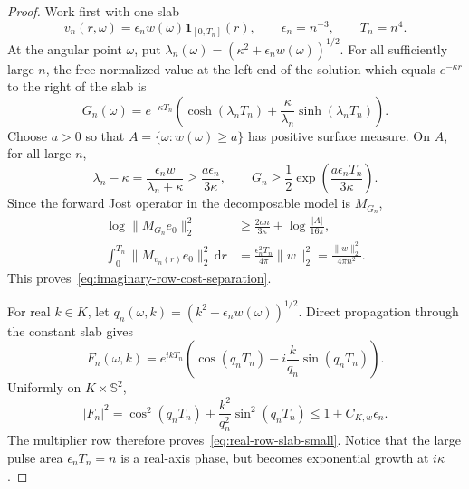 \documentclass[11pt]{article}
\newcommand{\dd}{\,\mathrm d}
\theoremstyle{definition}
\theoremstyle{remark}
\begin{document}
\begin{proof}
Work first with one slab
\begin{equation}
 v_n(r,\omega)=\epsilon_n w(\omega)\mathbf1_{[0,T_n]}(r),
 \qquad \epsilon_n=n^{-3},\qquad T_n=n^4.
 \label{eq:single-long-weak-slab}
\end{equation}
At the angular point $\omega$, put
$\lambda_n(\omega)=(\kappa^2+\epsilon_nw(\omega))^{1/2}$.
For all sufficiently large $n$, the free-normalized value at the left end of
the solution which equals $e^{-\kappa r}$ to the right of the slab is
\begin{equation}
 G_n(\omega)=e^{-\kappa T_n}
 \left(\cosh(\lambda_nT_n)
       +\frac{\kappa}{\lambda_n}\sinh(\lambda_nT_n)\right).
 \label{eq:imaginary-constant-slab-jost}
\end{equation}
Choose $a>0$ so that
$A=\{\omega:w(\omega)\geq a\}$ has positive surface measure.  On $A$,
for all large $n$,
\begin{equation}
 \lambda_n-\kappa
 =\frac{\epsilon_nw}{\lambda_n+\kappa}
 \geq\frac{a\epsilon_n}{3\kappa},
 \qquad
 G_n\geq\frac12
     \exp\!\left(\frac{a\epsilon_nT_n}{3\kappa}\right).
 \label{eq:imaginary-slab-row-lower-bound}
\end{equation}
Since the forward Jost operator in the decomposable model is $M_{G_n}$,
\begin{align}
 \log\|M_{G_n}e_0\|_2^2
 &\geq \frac{2an}{3\kappa}
      +\log\frac{|A|}{16\pi},
 \label{eq:imaginary-slab-row-divergence}\\
 \int_0^{T_n}\|M_{v_n(r)}e_0\|_2^2\dd r
 &=\frac{\epsilon_n^2T_n}{4\pi}\|w\|_2^2
   =\frac{\|w\|_2^2}{4\pi n^2}.
 \label{eq:imaginary-slab-vanishing-cost}
\end{align}
This proves~\eqref{eq:imaginary-row-cost-separation}.

For real $k\in K$, let
$q_n(\omega,k)=(k^2-\epsilon_nw(\omega))^{1/2}$.  Direct propagation through
the constant slab gives
\begin{equation}
 F_n(\omega,k)=e^{ikT_n}
 \left(\cos(q_nT_n)-i\frac{k}{q_n}\sin(q_nT_n)\right).
 \label{eq:real-constant-slab-jost}
\end{equation}
Uniformly on $K\times\mathbb S^2$,
\begin{equation}
 |F_n|^2
 =\cos^2(q_nT_n)+\frac{k^2}{q_n^2}\sin^2(q_nT_n)
 \leq1+C_{K,w}\epsilon_n.
 \label{eq:real-slab-row-modulus}
\end{equation}
The multiplier row therefore proves~\eqref{eq:real-row-slab-small}.  Notice
that the large pulse area $\epsilon_nT_n=n$ is a real-axis phase, but becomes
exponential growth at $i\kappa$.


\end{proof}
\end{document}
